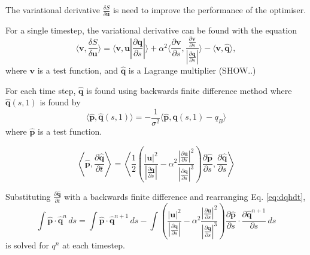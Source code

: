 \documentclass[a4paper, 12pt]{article}
\newcommand{\eq}[1]{Eq. \ref{eq:#1}}
\newcommand{\vect}[1]{\ensuremath{\mathbf{#1}}}
\newcommand{\hvect}[1]{\ensuremath{\hat{\vect{#1}}}}
\newcommand{\pp}[2]{\frac{\partial #1}{\partial #2}}
\begin{document}
The variational derivative $\frac{\delta S}{\delta \vect u}$ is need to improve
the performance of the optimiser. 

For a single timestep, the variational derivative can be found with the equation
\begin{equation}
  \label{eq:dsdu}
  \langle \vect v, \frac{\delta S}{\delta \vect u}\rangle =
  \langle \vect v, \vect u \left| \frac{\partial \vect q}{\partial s}\right |\rangle 
  + \alpha^2 \langle \frac{\partial \vect v}{\partial s},
  \frac{\frac{\partial \vect v}{\partial s} }{ \left|\frac{\partial \vect q}{\partial s}\right|}
\rangle - \langle \vect v, \hvect{q} \rangle,
\end{equation}
where $\vect v$ is a test function, and $\hvect q$ is a Lagrange multiplier (SHOW..)

For each time step, $\hvect q$ is found using backwards finite difference method
where $\hvect q(s,1)$ is found by
\begin{equation}
  \label{eq:qh1}
  \langle \hvect p, \hvect q(s,1) \rangle = - \frac{1}{\sigma^2}
  \langle \hvect p, \vect q(s,1) - q_B \rangle
\end{equation}
where $\hvect p$ is a test function.


\begin{equation}
  \label{eq:dqhdt}
  \left\langle \hvect{p},\pp{\hvect{q}}{t}\right\rangle = \left\langle \frac{1}{2}\left(
      \frac{|\vect u|^2}{\left|\pp{\vect q}{s}\right|}
      -\alpha^2\frac{\left|\pp{\vect u}{s}\right|^2}{\left|\pp{\vect q}{s}\right|^3}\right)
    \pp{\hvect{p}}{s},\pp{\hvect{q}}{s}\right\rangle 
\end{equation}




Substituting $\frac{\partial \hvect q}{\partial t}$ with a backwards finite difference and
rearranging \eq{dqhdt},
\begin{equation}
  \label{eq:fd_qh}
  \int \hvect p \cdot \hvect q^n \,ds = \int \hvect p \cdot \hvect q^{n+1} \,ds
  - \int
   \left( 
      \frac{|\vect u|^2}{\left|\pp{\vect q}{s}\right|}
      -\alpha^2\frac{\left|\pp{\vect u}{s}\right|^2}{\left|\pp{\vect q}{s}\right|^3}
  \right) \frac{ \partial \hvect p}{\partial s} 
  \cdot \frac{\partial \hvect q^{n+1}}{\partial s}\,ds
\end{equation}
is solved for $q^n$ at each timestep.
\end{document}

